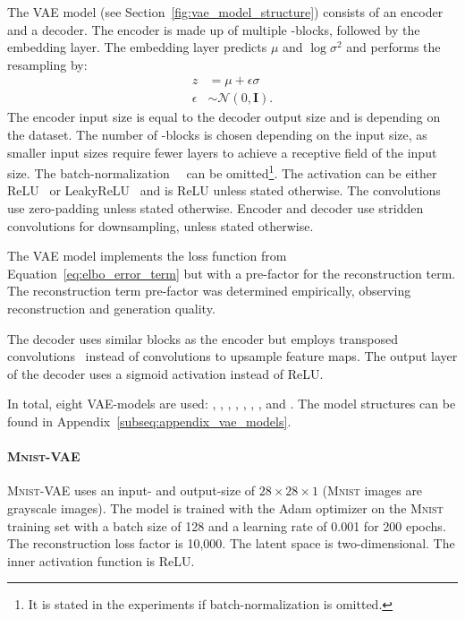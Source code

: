 The \ac{VAE} model (see Section~\ref{fig:vae_model_structure}) consists of an encoder and a decoder.
The encoder is made up of multiple -blocks, followed by the embedding layer.
The embedding layer predicts $\mu$ and $\log \sigma^2$ and performs the resampling by:
\begin{align}
    z &= \mu + \epsilon\sigma \\
    \epsilon &\sim \mathcal{N}(0, \bm{I}). \label{eq:resampling_vae}
\end{align}
The encoder input size is equal to the decoder output size and is depending on the dataset.
The number of -blocks is chosen depending on the input size, as smaller input sizes require fewer layers to achieve a receptive field of the input size.
The batch-normalization~~\citep[pp. 317, ff.]{Goodfellow-et-al-2016} can be omitted\footnote{It is stated in the experiments if batch-normalization is omitted.}.
The activation can be either ReLU~\citep[p. 173]{Goodfellow-et-al-2016} or LeakyReLU~\citep[p. 192]{Goodfellow-et-al-2016} and is ReLU unless stated otherwise.
The convolutions use zero-padding unless stated otherwise.
Encoder and decoder use stridden convolutions for downsampling, unless stated otherwise.

The \ac{VAE} model implements the loss function from Equation~\ref{eq:elbo_error_term} but with a pre-factor for the reconstruction term.
The reconstruction term pre-factor was determined empirically, observing reconstruction and generation quality.

The decoder uses similar blocks as the encoder but employs transposed convolutions~\citep[pp. 356, ff.]{Goodfellow-et-al-2016} instead of convolutions to upsample feature maps.
The output layer of the decoder uses a sigmoid activation instead of ReLU.

In total, eight \ac{VAE}-models are used: , , , , ,  , , and .
The model structures can be found in Appendix~\ref{subseq:appendix_vae_models}.

\paragraph{\textsc{Mnist}-\ac{VAE}} \textsc{Mnist}-\ac{VAE} uses an input- and output-size of $28\times 28\times 1$ (\textsc{Mnist} images are grayscale images).
The model is trained with the Adam optimizer on the \textsc{Mnist} training set with a batch size of 128 and a learning rate of 0.001 for 200 epochs.
The reconstruction loss factor is 10,000.
The latent space is two-dimensional.
The inner activation function is ReLU.

